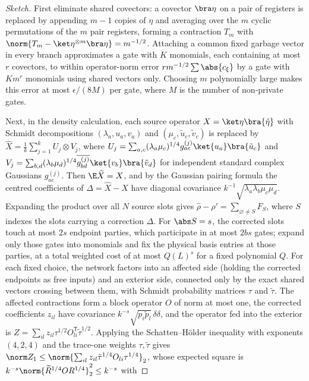 \begin{proof}[Sketch]
First eliminate shared covectors: a covector $\bra\eta$ on a pair of
registers is replaced by appending $m-1$ copies of $\eta$ and averaging over the
$m$ cyclic permutations of the $m$ pair registers, forming a contraction $T_m$ with
$\norm{T_m-\ket\eta^{\otimes m}\bra\eta}=m^{-1/2}$. Attaching a common fixed
garbage vector in every branch approximates a gate with $K$ monomials, each containing at
most $r$ covectors, to within operator-norm error
$rm^{-1/2}\sum\abs{c_\xi}$ by a gate with $Km^r$ monomials using shared
vectors only. Choosing $m$ polynomially large makes this error at most
$\epsilon/(8M)$ per gate, where $M$ is the number of non-private gates.

Next, in the density calculation, each source operator $X=\ket\eta\bra{\tilde\eta}$
with Schmidt decompositions $(\lambda_a,u_a,v_a)$ and $(\mu_c,\tilde u_c,\tilde v_c)$
is replaced by $\widehat X=\frac1k\sum_{j=1}^kU_j\otimes V_j$, where
$U_j=\sum_{a,c}(\lambda_a\mu_c)^{1/4}g^{(j)}_{ac}\ket{u_a}\bra{\tilde u_c}$ and
$V_j=\sum_{b,d}(\lambda_b\mu_d)^{1/4}\overline{g^{(j)}_{bd}}\ket{v_b}\bra{\tilde v_d}$
for independent standard complex Gaussians $g^{(j)}_{ac}$. Then
$\E\widehat X=X$, and by the Gaussian pairing formula the centred coefficients of $\Delta=\widehat X-X$ have
diagonal covariance $k^{-1}\sqrt{\lambda_a\lambda_b\mu_c\mu_d}$. Expanding the product over all $N$ source
slots gives $\widehat\rho-\rho'=\sum_{\varnothing\ne S}F_S$, where $S$ indexes
the slots carrying a correction $\Delta$. For $\abs S=s$, the corrected slots touch
at most $2s$ endpoint parties, which participate in at most $2bs$ gates; expand only
those gates into monomials and fix the physical basis entries at those
parties, at a total weighted cost of at most $Q(L)^s$ for a fixed polynomial $Q$.
For each fixed choice, the network factors into an affected side
(holding the corrected endpoints as free inputs) and an exterior side, connected
only by the exact shared vectors crossing between them, with Schmidt
probability matrices $\tau$ and $\tilde\tau$. The affected contractions form a
block operator $O$ of norm at most one, the corrected coefficients $z_{il}$
have covariance $k^{-s}\sqrt{p_i\tilde p_l}\,\delta\delta$, and the operator fed into the exterior
is $Z=\sum_{il}z_{il}\tau^{1/2}O_{li}^{\mathsf T}\tilde\tau^{1/2}$.
Applying the Schatten--Hölder inequality with exponents $(4,2,4)$ and the trace-one weights $\tau,\tilde\tau$ gives
$\norm Z_1\le\norm{\sum_{il}z_{il}\tilde\tau^{1/4}O_{li}\tau^{1/4}}_2$, whose expected
square is $k^{-s}\norm{\widetilde R^{1/4}OR^{1/4}}_2^2\le k^{-s}$ with

\end{proof}
